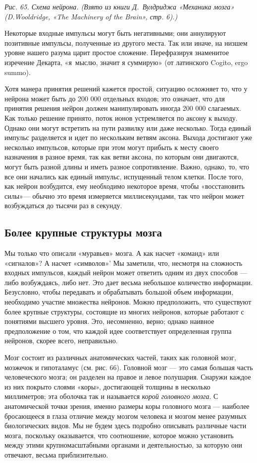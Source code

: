 \documentclass[../main.tex]{subfiles}
\begin{document}
\emph{Рис. 65. Схема нейрона. (Взято из книги Д.~Вулдриджа «Механика мозга» (D.Wooldridge, «The Machinery of the Brain», стр. 6).)}

Некоторые входные импульсы могут быть негативными; они аннулируют позитивные импульсы, полученные из другого места. Так или иначе, на низшем уровне нашего разума царит простое сложение. Перефразируя знаменитое изречение Декарта, «я~мыслю, значит я суммирую» (от латинского Cogito, ergo summo).

Хотя манера принятия решений кажется простой, ситуацию осложняет то, что у нейрона может быть до 200 000 отдельных входов; это означает, что для принятия решения нейрон должен манипулировать иногда 200 000 слагаемых. Как только решение принято, поток ионов устремляется по аксону к выходу. Однако они могут встретить на пути развилку или даже несколько. Тогда единый импульс разделяется и идет по нескольким ветвям аксона. Выхода достигают уже несколько импульсов, которые при этом могут прибыть к месту своего назначения в разное время, так как ветви аксона, по которым они двигаются, могут быть разной длины и иметь разное сопротивление. Важно, однако, то, что все они начались как единый импульс, испущенный телом клетки. После того, как нейрон возбудится, ему необходимо некоторое время, чтобы «восстановить силы»--- обычно это время измеряется миллисекундами, так что нейрон может возбуждаться до тысячи раз в секунду.


\subsection{Более крупные структуры мозга}

Мы только что описали «муравьев» мозга. А как насчет «команд» или «сигналов»? А насчет «символов»' Мы заметили, что, несмотря на сложность входных импульсов, каждый нейрон может ответить одним из двух способов --- либо возбуждаясь, либо нет. Это дает весьма небольшое количество информации. Безусловно, чтобы передавать и обрабатывать большой объем информации, необходимо участие множества нейронов. Можно предположить, что существуют более крупные структуры, состоящие из многих нейронов, которые работают с понятиями высшего уровня. Это, несомненно, верно; однако наивное предположение о том, что каждой идее соответствует определенная группа нейронов, скорее всего, неправильно.

Мозг состоит из различных анатомических частей, таких как головной мозг, мозжечок и гипоталамус (см. рис. 66). Головной мозг --- это самая большая часть человеческого мозга; он разделен на правое и левое полушария. Снаружи каждое из них покрыто слоями «коры», достигающей толщины в несколько миллиметров; эта оболочка так и называется \emph{корой головного мозга}. С анатомической точки зрения, именно размеры коры головного мозга --- наиболее бросающееся в глаза отличие между мозгом человека и мозгом менее разумных биологических видов. Мы не будем здесь подробно описывать различные части мозга, поскольку оказывается, что соотношение, которое можно установить между этими крупномасштабными органами и деятельностью, за которую они отвечают, весьма приблизительно.
\end{document}
